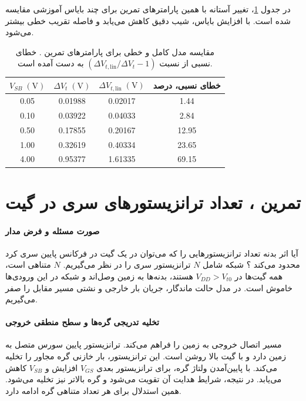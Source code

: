 در جدول \ref{tab:body-linearization-error}، تغییر آستانه با همین
پارامترهای تمرین برای چند بایاس آموزشی مقایسه شده است. با افزایش
بایاس، شیب دقیق کاهش می‌یابد و فاصله تقریب خطی بیشتر می‌شود.
\begin{table}[!htbp]
\centering
\small
\caption{مقایسه مدل کامل و خطی برای پارامترهای تمرین . خطای نسبی
از نسبت \((\Delta V_{t,\mathrm{lin}}/\Delta V_t-1)\) به دست آمده است.}
\label{tab:body-linearization-error}
\begin{tabular}{cccc}
\toprule
\(V_{SB}\; (\unit{\volt})\) &
\(\Delta V_t\; (\unit{\volt})\) &
\(\Delta V_{t,\mathrm{lin}}\; (\unit{\volt})\) & خطای نسبی، درصد\\
\midrule
\num{0.05} & \num{0.01988} & \num{0.02017} & \num{1.44}\\
\num{0.10} & \num{0.03922} & \num{0.04033} & \num{2.84}\\
\num{0.50} & \num{0.17855} & \num{0.20167} & \num{12.95}\\
\num{1.00} & \num{0.32619} & \num{0.40334} & \num{23.65}\\
\num{4.00} & \num{0.95377} & \num{1.61335} & \num{69.15}\\
\bottomrule
\end{tabular}
\end{table}

\section*{تمرین ، تعداد ترانزیستورهای سری در گیت}
\paragraph*{صورت مسئله و فرض مدار}
آیا اثر بدنه تعداد ترانزیستورهایی را که می‌توان در یک گیت 
در فرکانس پایین سری کرد محدود می‌کند
\cite[تمرین ، صفحه ۹۶]{weste}؟
شبکه  شامل \(N\) ترانزیستور سری  را در نظر
می‌گیریم. \(N\) متناهی است، همه گیت‌ها در \(V_{DD}>V_{t0}\) هستند،
بدنه‌ها به زمین وصل‌اند و شبکه  در این ورودی‌ها خاموش است.
در مدل حالت ماندگار، جریان بار خارجی و نشتی مسیر مقابل را صفر می‌گیریم.

\paragraph*{تخلیه تدریجی گره‌ها و سطح منطقی خروجی}
 مسیر اتصال خروجی به زمین را فراهم می‌کند.
ترانزیستور پایین سورس متصل به زمین دارد و با گیت بالا روشن است.
این ترانزیستور، بار خازنی گره مجاور را تخلیه می‌کند. با پایین‌آمدن
ولتاژ گره، برای ترانزیستور بعدی \(V_{GS}\) افزایش و \(V_{SB}\)
کاهش می‌یابد. در نتیجه، شرایط هدایت آن تقویت می‌شود و گره بالاتر
نیز تخلیه می‌شود. همین استدلال برای هر تعداد متناهی گره ادامه دارد.

